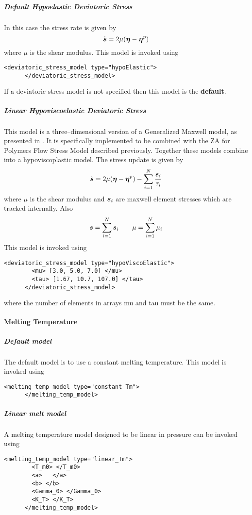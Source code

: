 \subparagraph{Default Hypoelastic Deviatoric Stress}
  In this case the stress rate is given by
  \begin{equation}
    \dot{\boldsymbol{s}} = 2\mu(\boldsymbol{\eta} - \boldsymbol{\eta}^p)
  \end{equation}
  where $\mu$ is the shear modulus.  This model is invoked using
  \begin{Verbatim}[fontsize=\footnotesize]  
      <deviatoric_stress_model type="hypoElastic">
      </deviatoric_stress_model>
  \end{Verbatim}
  If a deviatoric stress model is not specified then this model is the
  {\bf default}.

\subparagraph{Linear Hypoviscoelastic Deviatoric Stress}
  This model is a three--dimensional version of a Generalized Maxwell
  model, as presented in \cite{Zerilli07}.  It is specifically
  implemented to be combined with the ZA for Polymers Flow Stress
  Model described previously.  Together these models combine into a
  hypoviscoplastic model.  The stress update is given by
  \begin{equation}
    \dot{\boldsymbol{s}} = 2\mu(\boldsymbol{\eta} - \boldsymbol{\eta}^p) - \sum_{i=1}^N {\boldsymbol{s}_i\over \tau_i}
  \end{equation}
  where $\mu$ is the shear modulus and $\boldsymbol{s}_i$ are maxwell element
  stresses which are tracked internally.  Also
  \begin{equation}
    \boldsymbol{s} = \sum_{i=1}^N \boldsymbol{s}_i \quad\quad \mu = \sum_{i=1}^N \mu_i
  \end{equation}
  This model is invoked using
  \begin{Verbatim}[fontsize=\footnotesize]  
      <deviatoric_stress_model type="hypoViscoElastic">
        <mu> [3.0, 5.0, 7.0] </mu>
        <tau> [1.67, 10.7, 107.0] </tau>
      </deviatoric_stress_model>
  \end{Verbatim}
where the number of elements in arrays mu and tau must be the same.

\paragraph{Melting Temperature}
  \subparagraph{Default model}
  The default model is to use a constant melting temperature.  This model
  is invoked using
  \begin{Verbatim}[fontsize=\footnotesize]  
      <melting_temp_model type="constant_Tm">
      </melting_temp_model>
  \end{Verbatim}

  \subparagraph{Linear melt model}
  A melting temperature model designed to be linear in pressure can be invoked using
  \begin{Verbatim}[fontsize=\footnotesize]
      <melting_temp_model type="linear_Tm">
        <T_m0> </T_m0>
        <a>   </a>
        <b> </b>
        <Gamma_0> </Gamma_0>
        <K_T> </K_T>
      </melting_temp_model>
  \end{Verbatim}

